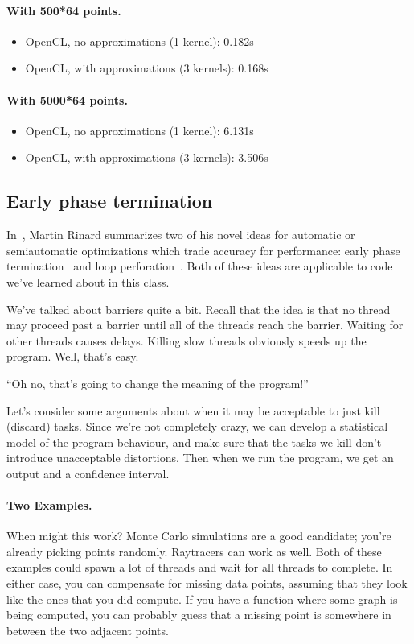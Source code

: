 \documentclass[a4paper]{report}
\begin{document}
\paragraph{With 500*64 points.}
\begin{itemize}
\item    OpenCL, no approximations (1 kernel): 0.182s
\item    OpenCL, with approximations (3 kernels): 0.168s
\end{itemize}
 \paragraph{With 5000*64 points.}
\begin{itemize}
\item    OpenCL, no approximations (1 kernel): 6.131s
\item    OpenCL, with approximations (3 kernels): 3.506s
\end{itemize}

\subsection*{Early phase termination}

In~\cite{Rinard:2010:PSA:1932682.1869525}, Martin Rinard summarizes
two of his novel ideas for automatic or semiautomatic optimizations
which trade accuracy for performance: early phase
termination~\cite{Rinard:2007:EarlyPhaseTermination} and loop
perforation~\cite{hoffmann09:_using_code_perfor_improv_perfor}. Both
of these ideas are applicable to code we've learned about in this
class.


We've talked about barriers quite a bit. Recall that the idea is that
no thread may proceed past a barrier until all of the threads
reach the barrier. Waiting for other threads causes delays. 
Killing slow threads obviously speeds up the program. Well, that's easy.

\begin{center}
``Oh no, that's going to change the meaning of the program!''
\end{center}

Let's consider some arguments about when it may be acceptable to just
kill (discard) tasks. Since we're not completely crazy, we can develop
a statistical model of the program behaviour, and make sure that the
tasks we kill don't introduce unacceptable distortions. Then when we
run the program, we get an output and a confidence interval.

\paragraph{Two Examples.} When might this work? Monte Carlo simulations
are a good candidate; you're already picking points randomly.
Raytracers can work as well. Both of these examples could spawn a lot
of threads and wait for all threads to complete.  In either case, you
can compensate for missing data points, assuming that they look like
the ones that you did compute. If you have a function where some graph is being
computed, you can probably guess that a missing point is somewhere in between
the two adjacent points.
\end{document}
